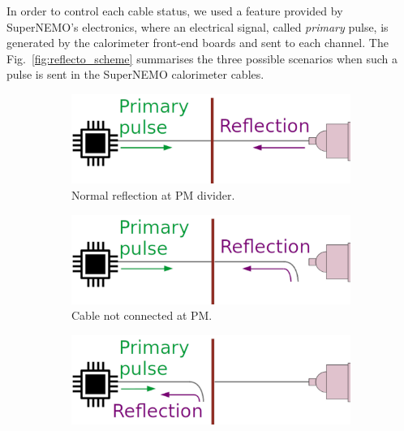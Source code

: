 In order to control each cable status, we used a feature provided by SuperNEMO's electronics, where an electrical signal, called \emph{primary} pulse, is generated by the calorimeter front-end boards and sent to each channel.
The Fig.~\ref{fig:reflecto_scheme} summarises the three possible scenarios when such a pulse is sent in the SuperNEMO calorimeter cables.
\begin{figure}[h!]
  \centering
  \begin{subfigure}[b]{0.3\textwidth}
    \centering
    \includegraphics[width=1.1\textwidth]{commissioning/fig_commissioning/scheme_reflecto.pdf}
    \captionsetup{justification=centering}
    \caption{Normal reflection at PM divider.
      \label{subfig:reflecto_normal}}
  \end{subfigure}
  \hfill
  \begin{subfigure}[b]{0.3\textwidth}
    \centering
    \includegraphics[width=1.1\textwidth]{commissioning/fig_commissioning/scheme_reflecto_1.pdf}
    \captionsetup{justification=centering}
    \caption{Cable not connected at PM.
      \label{subfig:reflecto_pmt}}
  \end{subfigure}
  \hfill
  \begin{subfigure}[b]{0.3\textwidth}
    \centering
    \includegraphics[width=1.1\textwidth]{commissioning/fig_commissioning/scheme_reflecto_2.pdf}

\end{subfigure}
\end{figure}
